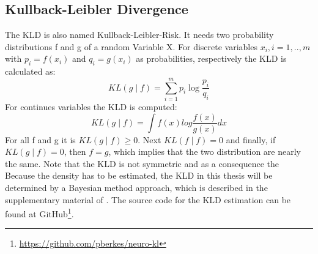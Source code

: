 \subsection{Kullback-Leibler Divergence}\label{TlSubSecKLD}
The \acl{KLD} is also named Kullback-Leibler-Risk.
It needs two probability distributions f and g of a random Variable X.
For discrete variables $x_i, i=1,..,m$ with $p_i=f(x_i)$ and $q_i=g(x_i)$ as probabilities, respectively the \acs{KLD} is calculated as:
\begin{equation}
KL(g\mid f) = \sum_{i=1}^{m}p_i\log\frac{p_i}{q_i}
\end{equation} 
For continues variables the \ac{KLD} is computed:
\begin{equation}
KL(g\mid f) = \int f(x)log\frac{f(x)}{g(x)} dx
\end{equation}
For all f and g it is $KL(g\mid f) \ge 0$. Next $KL(f\mid f) = 0$ and finally, if $KL(g\mid f) = 0$, then $f = g$, which implies that the two distribution are nearly the same.
Note that the \acs{KLD} is not symmetric and as a consequence the  \cite[p.5-7]{Commenges.}\\
Because the density has to be estimated, the \acs{KLD} in this thesis will be determined by a Bayesian method approach, which is described in the supplementary material of \cite{Berkes.2011}.
The source code for the \acs{KLD} estimation can be found at GitHub\footnote{\url{https://github.com/pberkes/neuro-kl}}.

